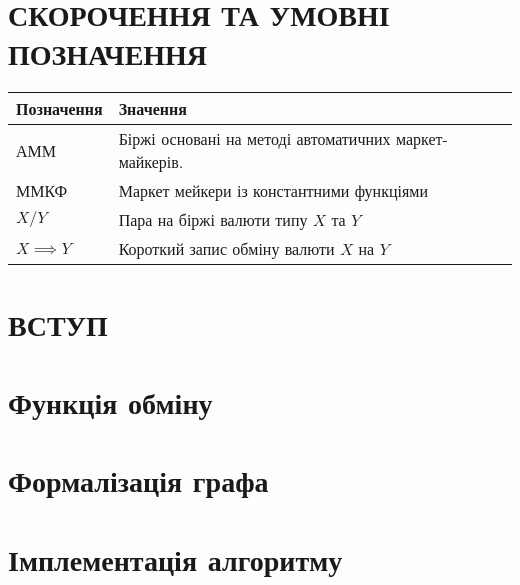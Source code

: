 \documentclass[14pt]{extarticle}
\begin{document}
\newpage

\renewcommand{\contentsname}{ЗМІСТ}
\setcounter{tocdepth}{2}
\tableofcontents
\newpage

\section*{СКОРОЧЕННЯ ТА УМОВНІ ПОЗНАЧЕННЯ}\label{sec:notation}

\begin{center}
	\begin{tabular}{ll}
		Позначення       & Значення                                               \\[0pt]
		\hline{}
		АММ              & Біржі основані на методі автоматичних маркет-майкерів. \\[0pt]
		ММКФ             & Маркет мейкери із константними функціями               \\[0pt]
		\(X/Y\)          & Пара на біржі валюти типу \(X\) та \(Y\)               \\[0pt]
		\(X \implies Y\) & Короткий запис обміну валюти \(X\) на \(Y\)            \\[0pt]
	\end{tabular}
\end{center}

\newpage

\section{ВСТУП}\label{sec:intro}


\newpage

\section{Функція обміну}\label{sec:swap-function}


\newpage

\section{Формалізація графа}\label{sec:graph}


\newpage

\section{Імплементація алгоритму}\label{sec:algorithm-impl}

\end{document}
